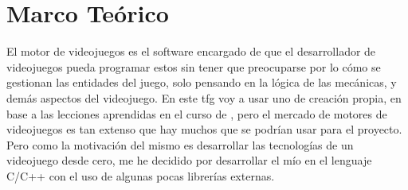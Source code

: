 
\chapter{Marco Teórico}
\label{marcoteorico}

El motor de videojuegos es el software encargado de que el desarrollador de videojuegos pueda programar estos sin tener que preocuparse por lo cómo se gestionan las entidades del juego, solo pensando en la lógica de las mecánicas, y demás aspectos del videojuego. En este \gls{tfg} voy a usar uno de creación propia, en base a las lecciones aprendidas en el curso de \citep{CursoMotorC++}, pero el mercado de motores de videojuegos es tan extenso que hay muchos que se podrían usar para el proyecto. Pero como la motivación del mismo es desarrollar las tecnologías de un videojuego desde cero, me he decidido por desarrollar el mío en el lenguaje C/C++ con el uso de algunas pocas librerías externas.

